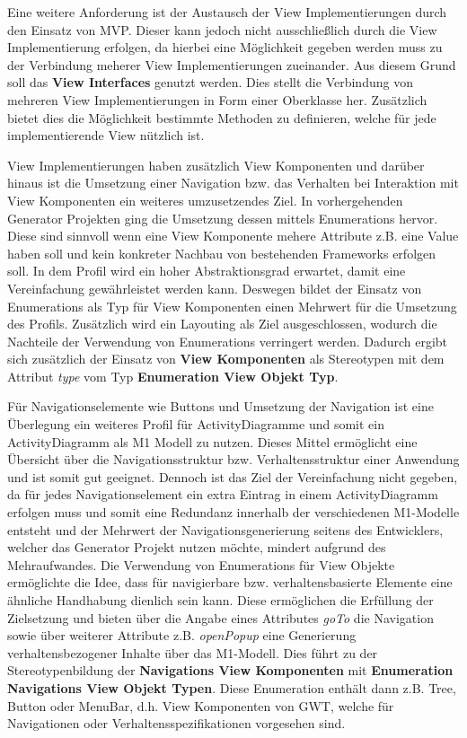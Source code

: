 Eine weitere Anforderung ist der Austausch der View Implementierungen durch den
Einsatz von MVP. Dieser kann jedoch nicht ausschließlich durch die View
Implementierung erfolgen, da hierbei eine Möglichkeit gegeben werden muss zu der
Verbindung meherer View Implementierungen zueinander. Aus diesem Grund soll das
\textbf{View Interfaces} genutzt werden. Dies stellt die Verbindung von mehreren
View Implementierungen in Form einer Oberklasse her. Zusätzlich bietet dies die
Möglichkeit bestimmte Methoden zu definieren, welche für jede implementierende
View nützlich ist. 

View Implementierungen haben zusätzlich View Komponenten und darüber hinaus ist
die Umsetzung einer Navigation bzw. das Verhalten bei Interaktion mit
View Komponenten ein weiteres umzusetzendes Ziel. In vorhergehenden Generator
Projekten ging die Umsetzung dessen mittels Enumerations hervor. Diese sind
sinnvoll wenn eine View Komponente mehere Attribute z.B. eine Value haben soll
und kein konkreter Nachbau von bestehenden Frameworks erfolgen soll. In dem Profil
wird ein hoher Abstraktionsgrad erwartet, damit eine Vereinfachung gewährleistet
werden kann. Deswegen bildet der Einsatz von Enumerations als Typ für
View Komponenten einen Mehrwert für die Umsetzung des Profils. Zusätzlich wird ein Layouting als
Ziel ausgeschlossen, wodurch die Nachteile der Verwendung von Enumerations
verringert werden. Dadurch ergibt sich zusätzlich der Einsatz von \textbf{View
Komponenten} als Stereotypen mit dem Attribut \textit{type} vom Typ
\textbf{Enumeration View Objekt Typ}.

Für Navigationselemente wie Buttons und Umsetzung der Navigation ist eine
Überlegung ein weiteres Profil für ActivityDiagramme und somit ein
ActivityDiagramm als M1 Modell zu nutzen. Dieses Mittel ermöglicht eine
Übersicht über die Navigationsstruktur bzw. Verhaltensstruktur einer Anwendung
und ist somit gut geeignet. Dennoch ist das Ziel der Vereinfachung nicht
gegeben, da für jedes Navigationselement ein extra Eintrag in einem
ActivityDiagramm erfolgen muss und somit eine Redundanz innerhalb der
verschiedenen M1-Modelle entsteht und der Mehrwert der Navigationsgenerierung
seitens des Entwicklers, welcher das Generator Projekt nutzen möchte, mindert
aufgrund des Mehraufwandes. Die Verwendung von Enumerations für View Objekte
ermöglichte die Idee, dass für navigierbare bzw. verhaltensbasierte Elemente
eine ähnliche Handhabung dienlich sein kann. Diese ermöglichen die Erfüllung der
Zielsetzung und bieten über die Angabe eines Attributes \textit{goTo} die
Navigation sowie über weiterer Attribute z.B. \textit{openPopup} eine
Generierung verhaltensbezogener Inhalte über das M1-Modell. Dies führt zu der
Stereotypenbildung der \textbf{Navigations View Komponenten} mit
\textbf{Enumeration Navigations View Objekt Typen}. Diese Enumeration enthält
dann z.B. Tree, Button oder MenuBar, d.h. View Komponenten von GWT, welche für
Navigationen oder Verhaltensspezifikationen vorgesehen sind.

